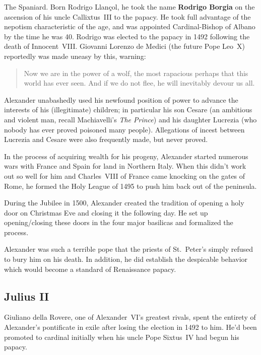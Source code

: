 The Spaniard.
Born Rodrigo Llan\c{c}ol,
he took the name \textbf{Rodrigo Borgia} on the ascension of his uncle Callixtus~III to the papacy.
He took full advantage of the nepotism characteristic of the age,
and was appointed Cardinal-Bishop of Albano by the time he was 40.
Rodrigo was elected to the papacy in 1492 following the death of Innocent~VIII\@.
Giovanni Lorenzo de Medici (the future Pope Leo~X) reportedly was made uneasy by this, warning:

\begin{quote}
  Now we are in the power of a wolf, the most rapacious perhaps that this world has ever seen.
  And if we do not flee, he will inevitably devour us all.
\end{quote}

Alexander unabashedly used his newfound position of power to advance the interests of his (illegitimate) children;
in particular his son Cesare (an ambitious and violent man, recall Machiavelli's \textit{The Prince})
and his daughter Lucrezia (who nobody has ever proved poisoned many people).
Allegations of incest between Lucrezia and Cesare were also frequently made, but never proved.

In the process of acquiring wealth for his progeny,
Alexander started numerous wars with France and Spain for land in Northern Italy.
When this didn't work out so well for him and Charles~VIII of France came knocking on the gates of Rome,
he formed the Holy League of 1495 to push him back out of the peninsula.

During the Jubilee in 1500,
Alexander created the tradition of opening a holy door on Christmas Eve and closing it the following day.
He set up opening/closing these doors in the four major basilicas and formalized the process.

Alexander was such a terrible pope that the priests of St.\ Peter's simply refused to bury him on his death.
In addition, he did establish the despicable behavior which would become a standard of Renaissance papacy.

\subsection*{Julius II}

Giuliano della Rovere, one of Alexander~VI's greatest rivals,
spent the entirety of Alexander's pontificate in exile after losing the election in 1492 to him.
He'd been promoted to cardinal initially when his uncle Pope Sixtus~IV had begun his papacy.


